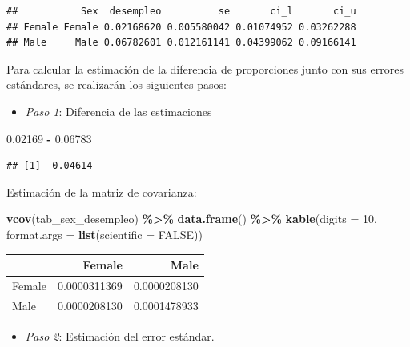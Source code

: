 \documentclass[
  12pt,
]{book}
\newenvironment{Shaded}{\begin{snugshade}}{\end{snugshade}}
\newcommand{\AttributeTok}[1]{\textcolor[rgb]{0.13,0.29,0.53}{#1}}
\newcommand{\ConstantTok}[1]{\textcolor[rgb]{0.56,0.35,0.01}{#1}}
\newcommand{\DecValTok}[1]{\textcolor[rgb]{0.00,0.00,0.81}{#1}}
\newcommand{\FloatTok}[1]{\textcolor[rgb]{0.00,0.00,0.81}{#1}}
\newcommand{\FunctionTok}[1]{\textcolor[rgb]{0.13,0.29,0.53}{\textbf{#1}}}
\newcommand{\NormalTok}[1]{#1}
\newcommand{\SpecialCharTok}[1]{\textcolor[rgb]{0.81,0.36,0.00}{\textbf{#1}}}
\providecommand{\tightlist}{%
  \setlength{\itemsep}{0pt}\setlength{\parskip}{0pt}}
\begin{document}
\begin{verbatim}
##           Sex  desempleo          se       ci_l       ci_u
## Female Female 0.02168620 0.005580042 0.01074952 0.03262288
## Male     Male 0.06782601 0.012161141 0.04399062 0.09166141
\end{verbatim}

Para calcular la estimación de la diferencia de proporciones junto con sus errores estándares, se realizarán los siguientes pasos:

\begin{itemize}
\tightlist
\item
  \emph{Paso 1}: Diferencia de las estimaciones
\end{itemize}

\begin{Shaded}
\begin{Highlighting}[]
\FloatTok{0.02169} \SpecialCharTok{{-}} \FloatTok{0.06783}   
\end{Highlighting}
\end{Shaded}

\begin{verbatim}
## [1] -0.04614
\end{verbatim}

Estimación de la matriz de covarianza:

\begin{Shaded}
\begin{Highlighting}[]
\FunctionTok{vcov}\NormalTok{(tab\_sex\_desempleo) }\SpecialCharTok{\%\textgreater{}\%} \FunctionTok{data.frame}\NormalTok{() }\SpecialCharTok{\%\textgreater{}\%} 
  \FunctionTok{kable}\NormalTok{(}\AttributeTok{digits =} \DecValTok{10}\NormalTok{,}
        \AttributeTok{format.args =} \FunctionTok{list}\NormalTok{(}\AttributeTok{scientific =} \ConstantTok{FALSE}\NormalTok{))}
\end{Highlighting}
\end{Shaded}

\begin{tabular}{l|r|r}
\hline
  & Female & Male\\
\hline
Female & 0.0000311369 & 0.0000208130\\
\hline
Male & 0.0000208130 & 0.0001478933\\
\hline
\end{tabular}

\begin{itemize}
\tightlist
\item
  \emph{Paso 2}: Estimación del error estándar.
\end{itemize}
\end{document}
